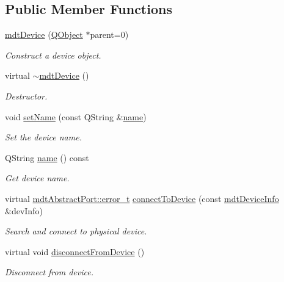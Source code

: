 \subsection*{Public Member Functions}
\begin{DoxyCompactItemize}
\item 
\hyperlink{classmdt_device_a6d501791e7243358cc61b144254b80db}{mdt\-Device} (\hyperlink{class_q_object}{Q\-Object} $\ast$parent=0)
\begin{DoxyCompactList}\small\item\em Construct a device object. \end{DoxyCompactList}\item 
virtual \hyperlink{classmdt_device_ac2a9cfd6042f3f9d8da4e84f044d3f4a}{$\sim$mdt\-Device} ()
\begin{DoxyCompactList}\small\item\em Destructor. \end{DoxyCompactList}\item 
void \hyperlink{classmdt_device_a80186f1aa6fbdc13f1652de978c35518}{set\-Name} (const Q\-String \&\hyperlink{classmdt_device_a7ad893c6885dbaef5a6cb980bfe627e0}{name})
\begin{DoxyCompactList}\small\item\em Set the device name. \end{DoxyCompactList}\item 
Q\-String \hyperlink{classmdt_device_a7ad893c6885dbaef5a6cb980bfe627e0}{name} () const 
\begin{DoxyCompactList}\small\item\em Get device name. \end{DoxyCompactList}\item 
virtual \hyperlink{classmdt_abstract_port_ad4121bb930c95887e77f8bafa065a85e}{mdt\-Abstract\-Port\-::error\-\_\-t} \hyperlink{classmdt_device_abab1b6e45af527880ce469ae318474c0}{connect\-To\-Device} (const \hyperlink{classmdt_device_info}{mdt\-Device\-Info} \&dev\-Info)
\begin{DoxyCompactList}\small\item\em Search and connect to physical device. \end{DoxyCompactList}\item 
virtual void \hyperlink{classmdt_device_a2b694a37d9464d27214bdeceec220998}{disconnect\-From\-Device} ()
\begin{DoxyCompactList}\small\item\em Disconnect from device. \end{DoxyCompactList}\item 

\end{DoxyCompactItemize}
